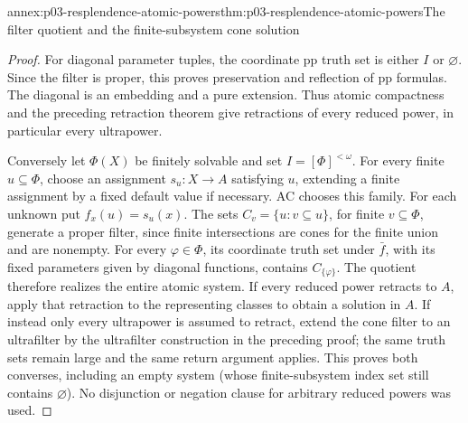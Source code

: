 \begin{annexitem}{annex:p03-resplendence-atomic-powers}{thm:p03-resplendence-atomic-powers}{The filter quotient and the finite-subsystem cone solution}
\begin{proof}
For diagonal parameter tuples, the coordinate pp truth set is either
\(I\) or \(\varnothing\). Since the filter is proper, this proves
preservation and reflection of pp formulas. The diagonal is an embedding
and a pure extension. Thus atomic compactness and the preceding retraction
theorem give retractions of every reduced power, in particular every
ultrapower.

Conversely let \(\Phi(X)\) be finitely solvable and set
\(I=[\Phi]^{<\omega}\). For every finite \(u\subseteq\Phi\),
choose an assignment \(s_u:X\to A\) satisfying \(u\), extending a
finite assignment by a fixed default value if necessary. AC chooses this
family. For each unknown put \(f_x(u)=s_u(x)\). The sets
\(C_v=\{u:v\subseteq u\}\), for finite \(v\subseteq\Phi\),
generate a proper filter, since finite intersections are cones for the
finite union and are nonempty. For every \(\varphi\in\Phi\), its
coordinate truth set under \(\bar f\), with its fixed parameters given
by diagonal functions, contains \(C_{\{\varphi\}}\). The quotient
therefore realizes the entire atomic system. If every reduced power
retracts to \(A\), apply that retraction to the representing classes
to obtain a solution in \(A\). If instead only every ultrapower is
assumed to retract, extend the cone filter to an ultrafilter by the
ultrafilter construction in the preceding proof; the same truth sets
remain large and the same return argument applies. This proves both
converses, including an empty system (whose finite-subsystem index set
still contains \(\varnothing\)). No disjunction or negation clause
for arbitrary reduced powers was used.
\end{proof}
\end{annexitem}

